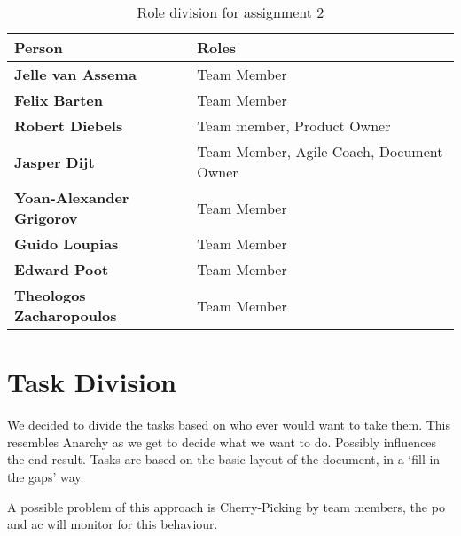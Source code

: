 \begin{table}[!ht]
    \centering
    \begin{tabular}{>{\bfseries}l l}
    Person                      & Roles\\
    \toprule
    Jelle van Assema            & Team Member                   \\ 
    Felix Barten                & Team Member                   \\
    Robert Diebels              & Team member, Product Owner                 \\   
    Jasper Dijt                 & Team Member, Agile Coach, Document Owner   \\
    Yoan-Alexander Grigorov     & Team Member                   \\
    Guido Loupias               & Team Member                   \\
    Edward Poot                 & Team Member                   \\
    Theologos Zacharopoulos     & Team Member                   \\
    \end{tabular}
    \caption{Role division for assignment 2}
    \label{tab:roles}
\end{table}

%

\section{Task Division}
We decided to divide the tasks based on who ever would want to take them. This resembles Anarchy as we get to decide what we want to do. Possibly influences the end result.
Tasks are based on the basic layout of the document, in a `fill in the gaps' way.

A possible problem of this approach is Cherry-Picking by team members, the \ac{po} and \ac{ac} will monitor for this behaviour.

